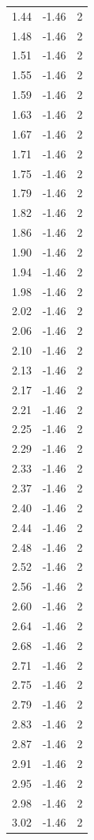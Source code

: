 \begin{longtable}{lrr}
  1.44 & -1.46 & 2 \\
  1.48 & -1.46 & 2 \\
  1.51 & -1.46 & 2 \\
  1.55 & -1.46 & 2 \\
  1.59 & -1.46 & 2 \\
  1.63 & -1.46 & 2 \\
  1.67 & -1.46 & 2 \\
  1.71 & -1.46 & 2 \\
  1.75 & -1.46 & 2 \\
  1.79 & -1.46 & 2 \\
  1.82 & -1.46 & 2 \\
  1.86 & -1.46 & 2 \\
  1.90 & -1.46 & 2 \\
  1.94 & -1.46 & 2 \\
  1.98 & -1.46 & 2 \\
  2.02 & -1.46 & 2 \\
  2.06 & -1.46 & 2 \\
  2.10 & -1.46 & 2 \\
  2.13 & -1.46 & 2 \\
  2.17 & -1.46 & 2 \\
  2.21 & -1.46 & 2 \\
  2.25 & -1.46 & 2 \\
  2.29 & -1.46 & 2 \\
  2.33 & -1.46 & 2 \\
  2.37 & -1.46 & 2 \\
  2.40 & -1.46 & 2 \\
  2.44 & -1.46 & 2 \\
  2.48 & -1.46 & 2 \\
  2.52 & -1.46 & 2 \\
  2.56 & -1.46 & 2 \\
  2.60 & -1.46 & 2 \\
  2.64 & -1.46 & 2 \\
  2.68 & -1.46 & 2 \\
  2.71 & -1.46 & 2 \\
  2.75 & -1.46 & 2 \\
  2.79 & -1.46 & 2 \\
  2.83 & -1.46 & 2 \\
  2.87 & -1.46 & 2 \\
  2.91 & -1.46 & 2 \\
  2.95 & -1.46 & 2 \\
  2.98 & -1.46 & 2 \\
  3.02 & -1.46 & 2 \\

\end{longtable}

